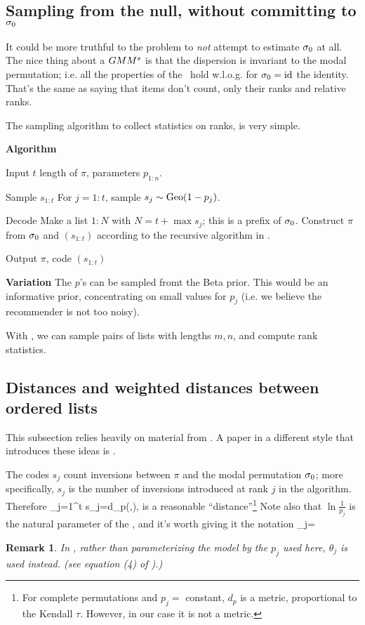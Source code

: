 \documentclass[10pt]{article}
\newtheorem{remark}[prop]{Remark}
\begin{document}
\subsection{Sampling from the null, without committing to $\sigma_0$}
\label{sec:gmm-sampling}
It could be more truthful to the problem to {\em not} attempt to estimate $\sigma_0$ at all. The nice thing about a $GMM^s$ is that the dispersion is invariant to the modal permutation; i.e. all the properties of the \gmms~hold w.l.o.g. for $\sigma_0={\rm id}$ the identity. That's the same as saying that items don't count, only their ranks and relative ranks.

The sampling algorithm to collect statistics on ranks, is very simple.

\benum
\item[]{\bf Algorithm} \algsamgmm
\item[Input] $t$ length of $\pi$,  parameters $p_{1:n}$.
\item[Sample $s_{1:t}$] For $j=1:t$, sample $s_j\sim \operatorname{Geo}(1-p_j)$.
\item[Decode] Make a list $1:N$ with $N=t+\max s_j$; this is a prefix of $\sigma_0$. Construct $\pi$ from $\sigma_0$ and $(s_{1:t})$ according to the recursive algorithm in \cite{MBao}. %
\item[Output] $\pi$, code $(s_{1:t})$
  \eenum

{\bf Variation} The $p$'s can be sampled fromt the Beta prior. This would be an informative prior, concentrating on small values for $p_j$ (i.e. we believe the recommender is not too noisy).

With \algsamgmm, we can sample pairs of lists with lengths $m,n$, and compute rank statistics. 


\subsection{Distances and weighted distances between ordered lists} 
\label{sec:distances}
This subsection relies heavily on material from \cite{MBao}. A paper in a different style that introduces these ideas is \cite{fligner:86}.

The codes $s_j$ count inversions between $\pi$ and the modal permutation $\sigma_0$; more specifically, $s_j$ is the number of inversions introduced at rank $j$ in the \algsamgmm algorithm. Therefore
\beq
\sum_{j=1}^t s_j\ln{}=d_p(\pi,\sigzero),
\eeq
%
is a reasonable ``distance''\footnote{For complete permutations and $p_j=$ constant, $d_p$ is a metric, proportional to the Kendall $\tau$. However, in our case it is not a metric.} Note also that $\ln\frac{1}{p_j}$ is the natural parameter of the \gmms, and it's worth giving it the notation
%
\beq
\theta_j\;=\;\ln{}
\eeq
%
\begin{remark}
    In \cite{MBao}, rather than parameterizing the model by the $p_j$ used here, $\theta_j$ is used instead. (see equation (4) of \cite{MBao}).)
\end{remark}
\end{document}
